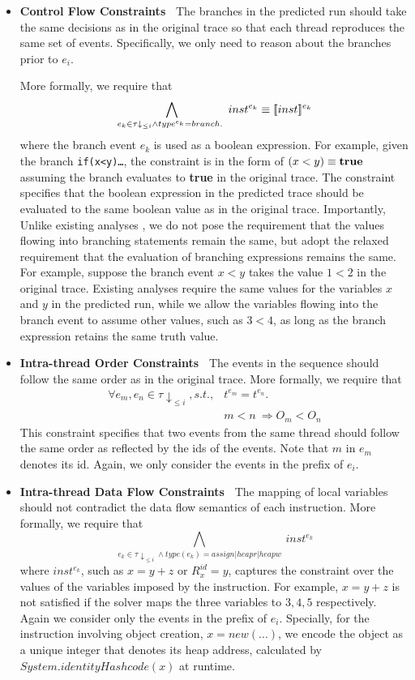 \begin{itemize}
\item {\bf Control Flow Constraints\ } The branches in the predicted run should take the same decisions as in the original trace so that each thread reproduces the same set of events.  Specifically, we only need to reason about the branches prior to $e_i$.

More formally,  we require that 
$$
\bigwedge_{e_k \in \tau\downarrow_{\leq i} \wedge  type^{e_k}=branch.\ }  inst^{e_k} 	\equiv \lbrack\!\lbrack inst \rbrack\!\rbrack^{e_k}
$$ 
where  the branch event $e_k$ is used as a boolean expression. For example, given the branch {\tt if(x<y)\dots}, the constraint is in the form of $(x<y)\equiv {\bf true}$ assuming the branch evaluates to {\bf true} in the original trace. The constraint specifies that the boolean expression in the predicted trace should be evaluated to the same boolean value as in the original trace. Importantly, Unlike existing analyses \cite{yannis,pldi14}, we do not pose the requirement that the values flowing into branching statements remain the same, but adopt the relaxed requirement that the evaluation of branching expressions remains the same. For example, suppose  the branch event $x<y$ takes the value $1<2$ in the original trace. Existing analyses require the same values for the variables $x$ and $y$ in the predicted run, while we allow  the variables flowing into the branch event to assume other values, such as $3<4$, as long as the branch expression retains the same truth value. 
\item {\bf Intra-thread Order Constraints\ } The events in the sequence should follow the same order as in the original trace. More formally, we require that
$$
\begin{array}{rl}
\forall e_m, e_n \in \tau\downarrow_{\leq i}, s.t., & t^{e_m} = t^{e_n}. \\
& m < n\  \Rightarrow O_{m} < O_{n}
\end{array}
$$ 
This constraint specifies that two events from the same thread should follow the same order as reflected by the ids of the events. Note that $m$ in $e_m$ denotes its id. Again, we only consider the events in the prefix of $e_i$.
\item {\bf Intra-thread Data Flow Constraints\ } The mapping of local variables should not contradict the data flow semantics of each instruction.   More formally, we require that
$$
\bigwedge_{e_k \in \tau\downarrow_{\leq i} \wedge type(e_k)=assign|heapr|heapw}\
	inst^{e_k}
$$
where $inst^{e_k}$, such as $x=y+z$ or $R^{id}_{x}=y$, captures the constraint over the values of the variables imposed by the instruction. For example, $x=y+z$ is not satisfied if the solver maps the three variables to $3, 4, 5$ respectively. Again we consider only the events in the prefix of  $e_i$. Specially, for the instruction involving object creation, $x=new (...)$, we encode the object as a unique integer that denotes its heap address, calculated by $System.identityHashcode(x)$ at runtime.
\end{itemize}



